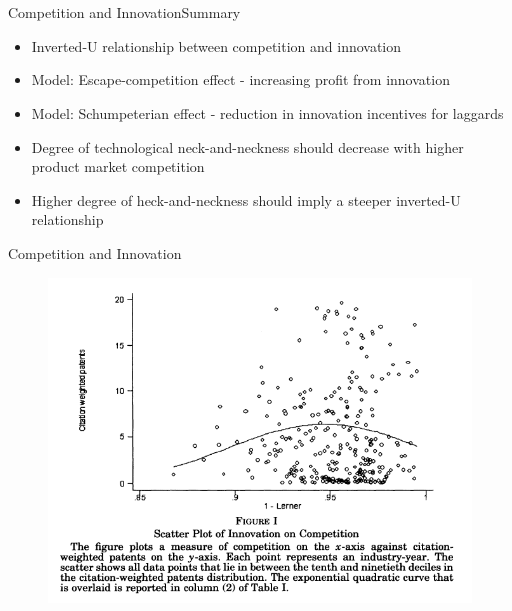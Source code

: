 \documentclass{beamer}
\begin{document}
\section{\cite{Aghion2005}}
\begin{frame}{Competition and Innovation}{Summary}
\begin{itemize}
\item{Inverted-U relationship between competition and innovation}
\item{Model: Escape-competition effect - increasing profit from innovation}
\item{Model: Schumpeterian effect - reduction in innovation incentives for laggards}
\item{Degree of technological neck-and-neckness should decrease with higher product market competition}
\item{Higher degree of heck-and-neckness should imply a steeper inverted-U relationship}
\end{itemize}
\end{frame}

\begin{frame}{Competition and Innovation}{}
\begin{figure}[h]
\begin{centering}
  \includegraphics[width=\textwidth]{0201}
   \label{fig:0201}
\end{centering}
\end{figure}
\end{frame}
\end{document}
